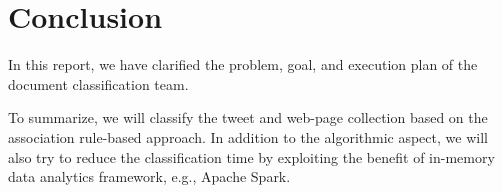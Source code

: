 \chapter{Conclusion}

In this report, we have clarified the problem, goal, and execution plan of the
document classification team.

To summarize, we will classify the tweet and web-page collection based on the
association rule-based approach.
In addition to the algorithmic aspect, we will also try to reduce the
classification time by exploiting the benefit of in-memory data analytics
framework, e.g., Apache Spark.

